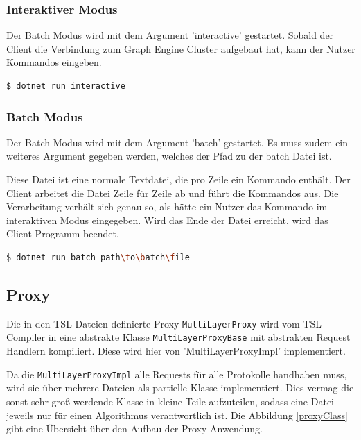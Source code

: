 \subsubsection{Interaktiver Modus}

Der Batch Modus wird mit dem Argument 'interactive' gestartet. Sobald der Client die Verbindung zum Graph Engine Cluster aufgebaut hat, kann der Nutzer Kommandos eingeben.


\begin{lstlisting}[language=bash]
  $ dotnet run interactive
\end{lstlisting}


\subsubsection{Batch Modus}
 Der Batch Modus wird mit dem Argument 'batch' gestartet. Es muss zudem ein weiteres Argument gegeben werden, welches der Pfad zu der batch Datei ist.

 Diese Datei ist eine normale Textdatei, die pro Zeile ein Kommando enthält. Der Client arbeitet die Datei Zeile für Zeile ab und führt die Kommandos aus.
 Die Verarbeitung verhält sich genau so, als hätte ein Nutzer das Kommando im interaktiven Modus eingegeben. Wird das Ende der Datei erreicht, wird das Client Programm beendet.

\begin{lstlisting}[language=bash]
  $ dotnet run batch path\to\batch\file 
\end{lstlisting}


\subsection{Proxy}



Die in den TSL Dateien definierte Proxy \verb|MultiLayerProxy| wird vom TSL Compiler in eine abstrakte Klasse \verb|MultiLayerProxyBase| mit abstrakten Request Handlern kompiliert. Diese wird hier von 'MultiLayerProxyImpl' implementiert.

Da die \verb|MultiLayerProxyImpl| alle Requests für alle Protokolle handhaben muss, wird sie über mehrere Dateien als partielle Klasse implementiert. Dies vermag die sonst sehr groß werdende Klasse in kleine Teile aufzuteilen, sodass eine Datei jeweils nur für einen Algorithmus verantwortlich ist.
Die Abbildung \ref{proxyClass} gibt eine Übersicht über den Aufbau der Proxy-Anwendung.


